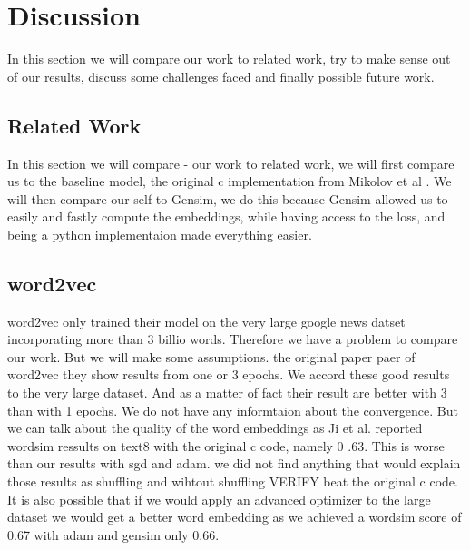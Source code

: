 \chapter{Discussion}\label{chap:discussion}



In this section we will compare our work to related work, try to make sense out of our results, discuss some challenges faced and finally possible future work. 
\section{Related Work}
In this section we will compare - our work to related work, we will first compare us to the baseline model, the original c implementation from Mikolov et al \cite{Mikolov}. We will then compare our self to Gensim, we do this because Gensim allowed us to easily and fastly compute the embeddings, while having access to the loss, and being a python implementaion made everything easier. 

\section{word2vec}
word2vec only trained their model on the very large google news datset incorporating more than 3 billio words. Therefore we have a problem to compare our work. But we will make some assumptions. 
 the original paper paer of word2vec they show results from one or 3 epochs. We accord these good results to the very large dataset. And as a matter of fact their result are better with 3 than with 1 epochs. We do not have any informtaion about the convergence. But we can talk about the quality of the word embeddings as Ji et al. reported wordsim ressults on text8 with the original c code, namely 0 .63. This is worse than our results with sgd and adam. we did not find anything that would explain those results as shuffling and wihtout shuffling VERIFY beat the original c code. It is also possible that if we would apply an advanced optimizer to the large dataset we would get a better word embedding as we achieved a wordsim score of 0.67 with adam and gensim only 0.66. 


